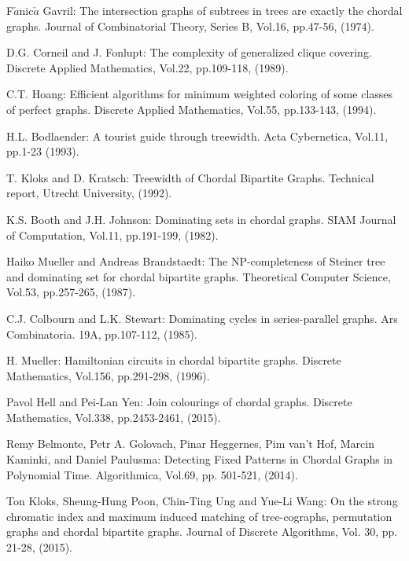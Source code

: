 \documentclass[runningheads]{llncs}
\begin{document}
\begin{thebibliography}{}
F$\check{a}$nic$\check{a}$ Gavril: The intersection graphs of subtrees in trees are exactly the chordal graphs. Journal of Combinatorial Theory, Series B, Vol.16, pp.47-56, (1974).

D.G. Corneil and J. Fonlupt: The complexity of generalized clique covering. Discrete Applied Mathematics, Vol.22, pp.109-118, (1989). 

C.T. Hoang: Efficient algorithms for minimum weighted coloring of some classes of perfect graphs. Discrete Applied Mathematics, Vol.55, pp.133-143, (1994).





H.L. Bodlaender: A tourist guide through treewidth. Acta Cybernetica, Vol.11, pp.1-23 (1993).

T. Kloks and D. Kratsch: Treewidth of Chordal Bipartite Graphs. Technical report, Utrecht University, (1992).







K.S. Booth and J.H. Johnson: Dominating sets in chordal graphs. SIAM Journal of Computation, Vol.11, pp.191-199, (1982).

Haiko Mueller and Andreas Brandstaedt: The NP-completeness of Steiner tree and dominating set for chordal bipartite graphs. Theoretical Computer Science, Vol.53, pp.257-265, (1987).

C.J. Colbourn and L.K. Stewart: Dominating cycles in series-parallel graphs. Ars Combinatoria. 19A, pp.107-112, (1985).


H. Mueller: Hamiltonian circuits in chordal bipartite graphs. Discrete Mathematics, Vol.156, pp.291-298, (1996).

Pavol Hell and Pei-Lan Yen: Join colourings of chordal graphs. Discrete Mathematics, Vol.338, pp.2453-2461, (2015).


Remy Belmonte, Petr A. Golovach, Pinar Heggernes, Pim van't Hof, Marcin Kaminki, and Daniel Paulusma: Detecting Fixed Patterns in Chordal Graphs
in Polynomial Time. Algorithmica, Vol.69, pp. 501-521, (2014).

Ton Kloks, Sheung-Hung Poon, Chin-Ting Ung and  Yue-Li Wang: On the strong chromatic index and maximum induced matching of tree-cographs, permutation graphs and chordal bipartite graphs. Journal of Discrete Algorithms, Vol. 30, pp. 21-28, (2015). 


\end{thebibliography}
\end{document}
